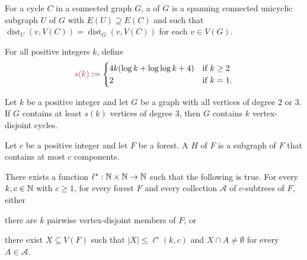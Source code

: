 \documentclass{patmorin}
\DeclareMathOperator{\dist}{dist}
\begin{document}
For a cycle $C$ in a connected graph $G$, a  of $G$ is a spanning connected unicyclic subgraph $U$ of $G$ with $E(U)\supseteq E(C)$ and such that $\dist_U(v,V(C))=\dist_G(v,V(C))$ for each $v\in V(G)$.

For all positive integers $k$, define
\[
\mathdefin{s(k)}:=\begin{cases}
4k(\log k + \log\log k +4)&\textrm{if $k\geq2$}\\
2&\textrm{if $k=1$.}
\end{cases}
\]
\begin{thm}
\label{thm:simonovits}
Let $k$ be a positive integer and
let $G$ be a graph with all vertices of degree $2$ or $3$.
If $G$ contains at least $s(k)$ vertices of degree $3$, then
$G$ contains $k$ vertex-disjoint cycles.
\end{thm}

Let $c$ be a positive integer and let $F$ be a forest. 
A  $H$ of $F$ is a subgraph of $F$ that contains at most $c$ components.
\begin{thm}\label{thm:gyarfas-lehel-general}
   There exists a function $\ell^\star:\mathbb{N}\times\mathbb{N}\to\mathbb{N}$ such that the following is true. For every $k,c\in\mathbb{N}$ with $c\geq1$, for every forest $F$ and 
    every collection $\mathcal{A}$ of $c$-subtrees of $F$, either
   \begin{compactenum}[(a)]
     \item there are $k$ pairwise vertex-disjoint members of $F$; or
     \item there exist $X \subseteq V(F)$ such that 
     $|X|\leq \ell^\star(k,c)$ and 
     $X\cap A\neq\emptyset$ for every $A\in\mathcal{A}$. 
   \end{compactenum}
\end{thm}
\end{document}
